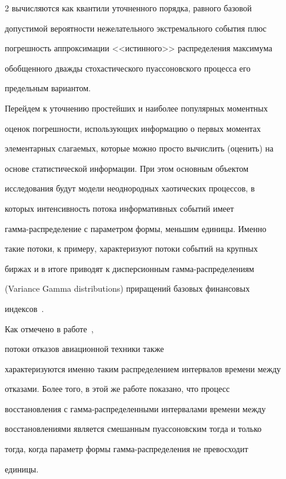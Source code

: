\begin{multicols}{2}
вычисляются как квантили уточненного порядка, равного базовой


допустимой вероятности нежелательного экстремального события плюс


погрешность аппроксимации <<истинного>> распределения максимума


обобщенного дважды стохастического пуассоновского процесса его


предельным вариантом.





Перейдем к уточнению простейших и наиболее популярных моментных


оценок погрешности, использующих информацию о первых моментах


элементарных слагаемых, которые можно просто вычислить (оценить) на


основе статистической информации. При этом основным объектом


исследования будут модели неоднородных хаотических процессов, в


которых интенсивность потока информативных событий имеет


гам\-ма-рас\-пре\-де\-ле\-ние с параметром формы, меньшим единицы. Именно


такие потоки, к примеру, характеризуют потоки событий на крупных


биржах и в итоге приводят к дисперсионным гам\-ма-рас\-пре\-де\-ле\-ни\-ям


(Variance Gamma distributions) приращений базовых финансовых


индексов~\cite{KorolevSokolov2012}. 





Как отмечено в работе~\cite{Gleser1987}, 


потоки отказов авиационной техники также


характеризуются именно таким распределением интервалов времени между


отказами. Более того, в этой же работе показано, что процесс


восстановления с гам\-ма-рас\-пре\-де\-лен\-ны\-ми интервалами времени между


восстановлениями является смешанным пуассоновским тогда и только


тогда, когда параметр формы гам\-ма-рас\-пре\-де\-ле\-ния не превосходит


единицы.






\end{multicols}
